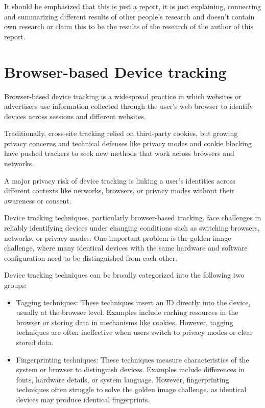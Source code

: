\documentclass{report}
\begin{document}
\alert{It should be emphasized that this is just a report, it is just explaining, connecting and summarizing different results of other people's research and doesn't contain own research or claim this to be the results of the research of the author of this report}. 


\section{Browser-based Device tracking}
\label{sec:Online browser-based device tracking}

\alert{Browser-based device tracking} is a widespread practice in which websites or advertisers use information collected through the user’s web browser to identify devices across sessions and different websites.

Traditionally, cross-site tracking relied on \alert{third-party cookies}, but growing privacy concerns and technical defenses like privacy modes and cookie blocking have pushed trackers to seek new methods that work across browsers and networks.

A major \alert{privacy risk} of device tracking is linking a user’s identities across different contexts like networks, browsers, or privacy modes without their awareness or consent.


Device tracking techniques, particularly browser-based tracking, face challenges in reliably identifying devices under changing conditions such as switching browsers, networks, or privacy modes. One important problem is the \alert{golden image challenge}, where many identical devices with the same hardware and software configuration need to be distinguished from each other.  

Device tracking techniques can be broadly categorized into the following two groups:

\begin{itemize}
    \item \alert{Tagging techniques:} These techniques insert an ID directly into the device, usually at the browser level. Examples include caching resources in the browser or storing data in mechanisms like cookies. However, tagging techniques are often ineffective when users switch to privacy modes or clear stored data.
    
    \item \alert{Fingerprinting techniques:} These techniques measure characteristics of the system or browser to distinguish devices. Examples include differences in fonts, hardware details, or system language. However, fingerprinting techniques often struggle to solve the golden image challenge, as identical devices may produce identical fingerprints.
\end{itemize}
\end{document}
